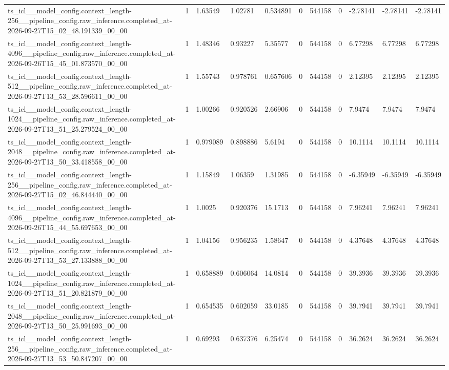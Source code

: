 \begin{tabular}{lllllllllll}
ts\_icl\_\_model\_config.context\_length-256\_\_pipeline\_config.raw\_inference.completed\_at-2026-09-27T15\_02\_48.191339\_00\_00 & 1 & 1.63549 & 1.02781 & 0.534891 & 0 & 544158 & 0 & -2.78141 & -2.78141 & -2.78141 \\
ts\_icl\_\_model\_config.context\_length-4096\_\_pipeline\_config.raw\_inference.completed\_at-2026-09-26T15\_45\_01.873570\_00\_00 & 1 & 1.48346 & 0.93227 & 5.35577 & 0 & 544158 & 0 & 6.77298 & 6.77298 & 6.77298 \\
ts\_icl\_\_model\_config.context\_length-512\_\_pipeline\_config.raw\_inference.completed\_at-2026-09-27T13\_53\_28.596611\_00\_00 & 1 & 1.55743 & 0.978761 & 0.657606 & 0 & 544158 & 0 & 2.12395 & 2.12395 & 2.12395 \\
ts\_icl\_\_model\_config.context\_length-1024\_\_pipeline\_config.raw\_inference.completed\_at-2026-09-27T13\_51\_25.279524\_00\_00 & 1 & 1.00266 & 0.920526 & 2.66906 & 0 & 544158 & 0 & 7.9474 & 7.9474 & 7.9474 \\
ts\_icl\_\_model\_config.context\_length-2048\_\_pipeline\_config.raw\_inference.completed\_at-2026-09-27T13\_50\_33.418558\_00\_00 & 1 & 0.979089 & 0.898886 & 5.6194 & 0 & 544158 & 0 & 10.1114 & 10.1114 & 10.1114 \\
ts\_icl\_\_model\_config.context\_length-256\_\_pipeline\_config.raw\_inference.completed\_at-2026-09-27T15\_02\_46.844440\_00\_00 & 1 & 1.15849 & 1.06359 & 1.31985 & 0 & 544158 & 0 & -6.35949 & -6.35949 & -6.35949 \\
ts\_icl\_\_model\_config.context\_length-4096\_\_pipeline\_config.raw\_inference.completed\_at-2026-09-26T15\_44\_55.697653\_00\_00 & 1 & 1.0025 & 0.920376 & 15.1713 & 0 & 544158 & 0 & 7.96241 & 7.96241 & 7.96241 \\
ts\_icl\_\_model\_config.context\_length-512\_\_pipeline\_config.raw\_inference.completed\_at-2026-09-27T13\_53\_27.133888\_00\_00 & 1 & 1.04156 & 0.956235 & 1.58647 & 0 & 544158 & 0 & 4.37648 & 4.37648 & 4.37648 \\
ts\_icl\_\_model\_config.context\_length-1024\_\_pipeline\_config.raw\_inference.completed\_at-2026-09-27T13\_51\_20.821879\_00\_00 & 1 & 0.658889 & 0.606064 & 14.0814 & 0 & 544158 & 0 & 39.3936 & 39.3936 & 39.3936 \\
ts\_icl\_\_model\_config.context\_length-2048\_\_pipeline\_config.raw\_inference.completed\_at-2026-09-27T13\_50\_25.991693\_00\_00 & 1 & 0.654535 & 0.602059 & 33.0185 & 0 & 544158 & 0 & 39.7941 & 39.7941 & 39.7941 \\
ts\_icl\_\_model\_config.context\_length-256\_\_pipeline\_config.raw\_inference.completed\_at-2026-09-27T13\_53\_50.847207\_00\_00 & 1 & 0.69293 & 0.637376 & 6.25474 & 0 & 544158 & 0 & 36.2624 & 36.2624 & 36.2624 \\

\end{tabular}
